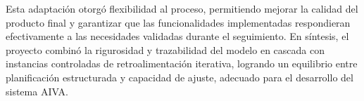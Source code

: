 Esta adaptación otorgó flexibilidad al proceso, permitiendo mejorar la calidad del producto final y garantizar que las funcionalidades implementadas respondieran efectivamente a las necesidades validadas durante el seguimiento. En síntesis, el proyecto combinó la rigurosidad y trazabilidad del modelo en cascada con instancias controladas de retroalimentación iterativa, logrando un equilibrio entre planificación estructurada y capacidad de ajuste, adecuado para el desarrollo del sistema AIVA.


\vspace{1cm}

